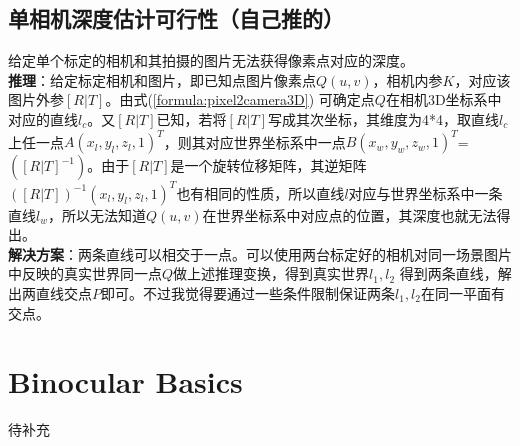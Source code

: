 \documentclass[UTF8]{ctexart}
\begin{document}
\subsection{单相机深度估计可行性（自己推的）}
给定单个标定的相机和其拍摄的图片无法获得像素点对应的深度。\\
\textbf{推理}：给定标定相机和图片，即已知点图片像素点$Q(u,v)$，相机内参$K$，对应该图片外参$[R|T]$。由式(\ref{formula:pixel2camera3D}) 可确定点$Q$在相机3D坐标系中对应的直线$l_c$。又$[R|T]$已知，若将$[R|T]$写成其次坐标，其维度为4*4，取直线$l_c$上任一点$A(x_l,y_l,z_l,1)^T$，则其对应世界坐标系中一点$B(x_w,y_w,z_w,1)^T$=$([R|T]^{-1})$。由于$[R|T]$是一个旋转位移矩阵，其逆矩阵$([R|T])^{-1}(x_l,y_l,z_l,1)^T$也有相同的性质，所以直线$l$对应与世界坐标系中一条直线$l_w$，所以无法知道$Q(u,v)$在世界坐标系中对应点的位置，其深度也就无法得出。\\
\textbf{解决方案}：两条直线可以相交于一点。可以使用两台标定好的相机对同一场景图片中反映的真实世界同一点$Q$做上述推理变换，得到真实世界$l_1,l_2$ 得到两条直线，解出两直线交点$P$即可。不过我觉得要通过一些条件限制保证两条$l_1,l_2$在同一平面有交点。
\section{Binocular Basics}
待补充
\end{document}
